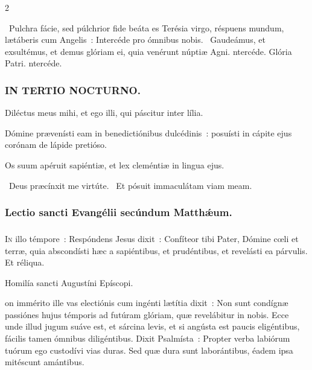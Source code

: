 \documentclass[9pt,twoside]{extarticle}
\begin{document}
\begin{multicols}{2}
{{{\begin{tightlist}{}
\item {}~Pulchra fácie, sed púlchrior fide beáta es Terésia virgo, réspuens mundum, lætáberis cum Angelis~: \textred{*} Intercéde pro ómnibus nobis. ~Gaudeámus, et exsultémus, et demus glóriam ei, quia venérunt núptiæ Agni. ntercéde. Glória Patri. ntercéde.
\end{tightlist}

\subsubsection*{\center \textsc{IN TERTIO NOCTURNO.}}
\begin{tightlist}{}
\item {} Diléctus meus mihi, et ego illi, qui páscitur inter lília.
\item {} Dómine prævenísti eam in benedictiónibus dulcédinis~: posuísti in cápite ejus corónam de lápide pretióso.
\item {} Os suum apéruit sapiéntiæ, et lex cleméntiæ in lingua ejus. 
\item {}~Deus præcínxit me virtúte. ~Et pósuit immaculátam viam meam.
\end{tightlist}

\subsubsection*{\center Lectio sancti Evangélii secúndum Matthǽum.}
\subsubsection*{\center {}}
\lettrine{I}n illo témpore~: Respóndens Jesus dixit~: Confíteor tibi Pater, Dómine cœli et terræ, quia abscondísti hæc a sapiéntibus, et prudéntibus, et revelásti ea párvulis. Et réliqua.

\begin{center}Homilía sancti Augustíni Epíscopi.\\
\end{center}
on immérito ille vas electiónis cum ingénti lætítia dixit~: Non sunt condígnæ passiónes hujus témporis ad futúram glóriam, quæ revelábitur in nobis. Ecce unde illud jugum suáve est, et sárcina levis, et si angústa est paucis eligéntibus, fácilis tamen ómnibus diligéntibus. Dixit Psalmísta~: Propter verba labiórum tuórum ego custodívi vias duras. Sed quæ dura sunt laborántibus, éadem ipsa mitéscunt amántibus.

}}}
\end{multicols}
\end{document}
